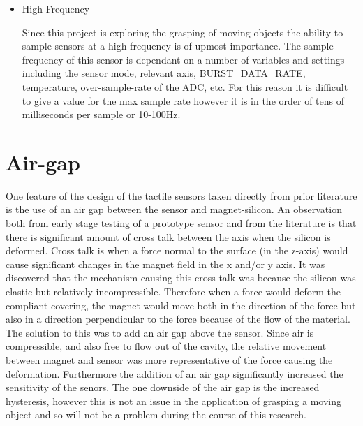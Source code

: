 \begin{itemize}
    \item High Frequency
    
    Since this project is exploring the grasping of moving objects the ability to sample sensors at a high frequency is of upmost importance. The sample frequency of this sensor is dependant on a number of variables and settings including the sensor mode, relevant axis, BURST\_DATA\_RATE, temperature, over-sample-rate of the ADC, etc. For this reason it is difficult to give a value for the max sample rate however it is in the order of tens of milliseconds per sample or 10-100Hz.
\end{itemize}

\section{Air-gap}
One feature of the design of the tactile sensors taken directly from prior literature is the use of an air gap between the sensor and magnet-silicon. An observation both from early stage testing of a prototype sensor and from the literature is that there is significant amount of cross talk between the axis when the silicon is deformed. Cross talk is when a force normal to the surface (in the z-axis) would cause significant changes in the magnet field in the x and/or y axis. It was discovered that the mechanism causing this cross-talk was because the silicon was elastic but relatively incompressible. Therefore when a force would deform the compliant covering, the magnet would move both in the direction of the force but also in a direction perpendicular to the force because of the flow of the material. The solution to this was to add an air gap above the sensor. Since air is compressible, and also free to flow out of the cavity, the relative movement between magnet and sensor was more representative of the force causing the deformation. Furthermore the addition of an air gap significantly increased the sensitivity of the senors. The one downside of the air gap is the increased hysteresis, however this is not an issue in the application of grasping a moving object and so will not be a problem during the course of this research.


